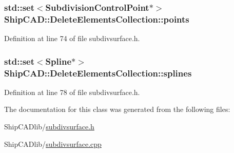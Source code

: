 \subsubsection[{\texorpdfstring{points}{points}}]{\setlength{\rightskip}{0pt plus 5cm}std\+::set$<${\bf Subdivision\+Control\+Point}$\ast$$>$ Ship\+C\+A\+D\+::\+Delete\+Elements\+Collection\+::points}\hypertarget{classShipCAD_1_1DeleteElementsCollection_a7e5748f6463683b23a8b762ceadeb49a}{}\label{classShipCAD_1_1DeleteElementsCollection_a7e5748f6463683b23a8b762ceadeb49a}


Definition at line 74 of file subdivsurface.\+h.

\subsubsection[{\texorpdfstring{splines}{splines}}]{\setlength{\rightskip}{0pt plus 5cm}std\+::set$<${\bf Spline}$\ast$$>$ Ship\+C\+A\+D\+::\+Delete\+Elements\+Collection\+::splines}\hypertarget{classShipCAD_1_1DeleteElementsCollection_a80150f5eea2654362d89f14105212c1c}{}\label{classShipCAD_1_1DeleteElementsCollection_a80150f5eea2654362d89f14105212c1c}


Definition at line 78 of file subdivsurface.\+h.



The documentation for this class was generated from the following files\+:\begin{DoxyCompactItemize}
\item 
Ship\+C\+A\+Dlib/\hyperlink{subdivsurface_8h}{subdivsurface.\+h}\item 
Ship\+C\+A\+Dlib/\hyperlink{subdivsurface_8cpp}{subdivsurface.\+cpp}\end{DoxyCompactItemize}
